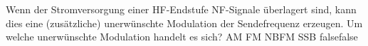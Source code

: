     {Wenn der Stromversorgung einer HF-Endstufe NF-Signale überlagert sind, kann dies eine (zusätzliche) unerwünschte Modulation der Sendefrequenz erzeugen. Um welche unerwünschte Modulation handelt es sich?}
    {AM}
    {FM}
    {NBFM}
    {SSB}
    {false}{false}